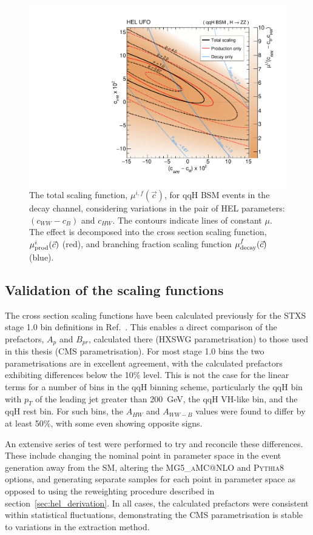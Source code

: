 \begin{figure}[htb!]
  \centering
  \includegraphics[width=.7\textwidth]{Figures/eft/scaling_functions/qqH_BSM_hzz_cWWMinuscB_vs_cHW.pdf}
  \caption[Two-dimensional HEL total scaling function example]
  {
    The total scaling function, $\mu^{i,f}(\vec{c})$, for qqH BSM events in the \Hfl decay channel, considering variations in the pair of HEL parameters: $(c_{WW}-c_B)$ and $c_{HW}$. The contours indicate lines of constant $\mu$. The effect is decomposed into the cross section scaling function, $\mu_{\rm{prod}}^i(\vec{c})$ (red), and branching fraction scaling function $\mu_{\rm{decay}}^f(\vec{c})$ (blue).
  }
  \label{fig:hel_total_example}
\end{figure}

\subsection{Validation of the scaling functions}\label{sec:hel_validation}
The cross section scaling functions have been calculated previously for the STXS stage 1.0 bin definitions in Ref.~\cite{Hays:2673969}. This enables a direct comparison of the prefactors, $A_p$ and $B_{pr}$, calculated there (HXSWG parametrisation) to those used in this thesis (CMS parametrisation). For most stage 1.0 bins the two parametrisations are in excellent agreement, with the calculated prefactors exhibiting differences below the 10\% level. This is not the case for the linear terms for a number of bins in the qqH binning scheme, particularly the qqH bin with $p_T$ of the leading jet greater than 200~GeV, the qqH VH-like bin, and the qqH rest bin. For such bins, the $A_{HW}$ and $A_{WW-B}$ values were found to differ by at least 50\%, with some even showing opposite signs.

An extensive series of test were performed to try and reconcile these differences. These include changing the nominal point in parameter space in the event generation away from the SM, altering the \textsc{MG5\_aMC@NLO} and \textsc{Pythia8} options, and generating separate samples for each point in parameter space as opposed to using the reweighting procedure described in section~\ref{sec:hel_derivation}. In all cases, the calculated prefactors were consistent within statistical fluctuations, demonstrating the CMS parametrisation is stable to variations in the extraction method. 

